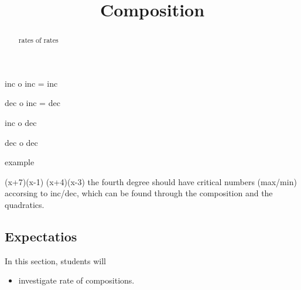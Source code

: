 \documentclass{ximera}
\title{Composition}
\begin{document}
\begin{abstract}
rates of rates
\end{abstract}
\maketitle



inc o inc = inc

dec o inc = dec

inc o dec 

dec o dec


example

(x+7)(x-1)
(x+4)(x-3)
the fourth degree should have critical numbers (max/min) accorsing to inc/dec, which can be found through the composition and the quadratics.





\subsection{Expectatios}


\begin{sectionOutcomes}
In this section, students will 

\begin{itemize}
\item investigate rate of compositions.

\end{itemize}
\end{sectionOutcomes}
\end{document}
